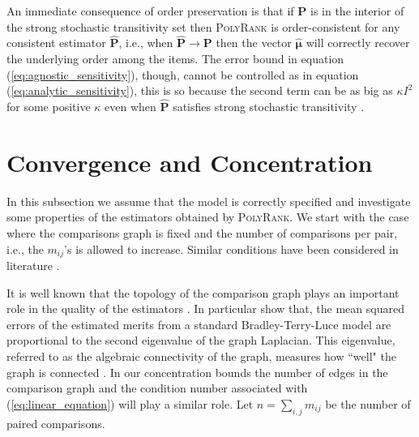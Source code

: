 \documentclass[twoside,11pt]{article}
\begin{document}
An immediate consequence of order preservation is that if  $\boldsymbol{P}$ is in the interior of the strong stochastic transitivity set then \textsc{PolyRank} is order-consistent for any consistent estimator $\boldsymbol{\hat P}$, i.e., when $\boldsymbol{\hat P}\to \boldsymbol{P}$ then the vector  $\boldsymbol{\hat{\mu}}$ will correctly recover the underlying order among the items. The error bound in equation (\ref{eq:agnostic_sensitivity}), though, cannot be controlled as in equation (\ref{eq:analytic_sensitivity}), this is so because the second term can be as big as $\kappa I^2$ for some positive $\kappa$ even when $\boldsymbol{\hat P}$  satisfies  strong stochastic transitivity  \citep{shah}.

\section{Convergence and Concentration}
\label{sec:statistical_properties}

In this subsection we assume that the model is correctly specified and investigate some properties of the estimators obtained by \textsc{PolyRank}. We start with the case where the comparisons graph is fixed and the number of comparisons per pair, i.e., the $m_{ij}$'s is allowed to increase. Similar conditions have been considered in literature \citep{rajkumar,shah2}. 


It is well known that the topology of the comparison graph plays an important role in the quality of the estimators \citep{shah2, massey, colley}. In particular \citet{shah2} show that, the mean squared errors of the estimated merits from a standard Bradley-Terry-Luce model are proportional to the second eigenvalue of the graph Laplacian. This eigenvalue, referred to as the algebraic connectivity of the graph, measures how ``well" the graph is connected \citep{chung2}. In our concentration bounds the number of edges in the comparison graph and the condition number associated with (\ref{eq:linear_equation}) will play a similar role. Let  $n = \sum_{i,j} m_{ij} $ be the number of paired comparisons.
\end{document}
